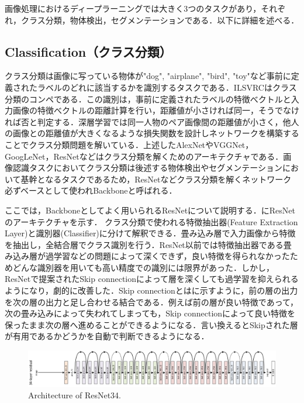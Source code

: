 
画像処理におけるディープラーニングでは大きく3つのタスクがあり，それぞれ，クラス分類，物体検出，セグメンテーションである．以下に詳細を述べる．

\subsection{Classification（クラス分類）}
クラス分類は画像に写っている物体が"dog", "airplane", "bird", "toy"など事前に定義されたラベルのどれに該当するかを識別するタスクである．ILSVRCはクラス分類のコンペである．この識別は，事前に定義されたラベルの特徴べクトルと入力画像の特徴べクトルの距離計算を行い，距離値が小さければ同一，そうでなければ否と判定する．深層学習では同一人物のペア画像間の距離値が小さく，他人の画像との距離値が大きくなるような損失関数を設計しネットワークを構築することでクラス分類問題を解いている．上述したAlexNetやVGGNet，GoogLeNet，ResNetなどはクラス分類を解くためのアーキテクチャである．画像認識タスクにおいてクラス分類は後述する物体検出やセグメンテーションにおいて基幹となるタスクであるため，ResNetなどクラス分類を解くネットワーク必ずベースとして使われBackboneと呼ばれる．

ここでは，Backboneとしてよく用いられるResNetについて説明する．にResNetのアーキテクチャを示す．
クラス分類で使われる特徴抽出器(Feature Extraction Layer)と識別器(Classifier)に分けて解釈できる．畳み込み層で入力画像から特徴を抽出し，全結合層でクラス識別を行う．ResNet以前では特徴抽出器である畳み込み層が過学習などの問題によって深くできず，良い特徴を得られなかったためどんな識別器を用いても高い精度での識別には限界があった．しかし，ResNetで提案されたSkip connectionによって層を深くしても過学習を抑えられるようになり，劇的に改善した．Skip connectionとはに示すように，前の層の出力を次の層の出力と足し合わせる結合である．例えば前の層が良い特徴であって，次の畳み込みによって失われてしまっても，Skip connectionによって良い特徴を保ったまま次の層へ進めることができるようになる．言い換えるとSkipされた層が有用であるかどうかを自動で判断できるようになる．

\begin{figure}
    \centering
    \includegraphics[width=\linewidth]{figure/chapter2/resnet34}
    \caption{Architecture of ResNet34.}
    \label{fig:ResNet}
\end{figure}

